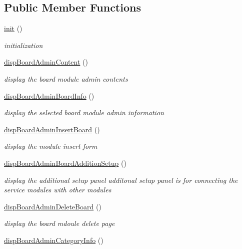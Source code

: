\subsection*{Public Member Functions}
\begin{DoxyCompactItemize}
\item 
\hyperlink{classboardAdminView_ac0c66d07632b7766e07543149e0b8cc5}{init} ()
\begin{DoxyCompactList}\small\item\em initialization \end{DoxyCompactList}\item 
\hyperlink{classboardAdminView_a9e8c74683b01595dc6dafa5f2f41dd53}{disp\+Board\+Admin\+Content} ()
\begin{DoxyCompactList}\small\item\em display the board module admin contents \end{DoxyCompactList}\item 
\hyperlink{classboardAdminView_a3712817f1117103b470796946abc62a4}{disp\+Board\+Admin\+Board\+Info} ()
\begin{DoxyCompactList}\small\item\em display the selected board module admin information \end{DoxyCompactList}\item 
\hyperlink{classboardAdminView_a823448c68fe8c5d8f13b1854f6478c0d}{disp\+Board\+Admin\+Insert\+Board} ()
\begin{DoxyCompactList}\small\item\em display the module insert form \end{DoxyCompactList}\item 
\hyperlink{classboardAdminView_a684dcfc8eba6453f2de80730f32f364f}{disp\+Board\+Admin\+Board\+Addition\+Setup} ()
\begin{DoxyCompactList}\small\item\em display the additional setup panel additonal setup panel is for connecting the service modules with other modules \end{DoxyCompactList}\item 
\hyperlink{classboardAdminView_a6db8342036e86100dd74b2af2e027a6f}{disp\+Board\+Admin\+Delete\+Board} ()
\begin{DoxyCompactList}\small\item\em display the board mdoule delete page \end{DoxyCompactList}\item 
\hyperlink{classboardAdminView_a53544e00aae20f5b0dfa86f15cc1895b}{disp\+Board\+Admin\+Category\+Info} ()

\end{DoxyCompactItemize}
